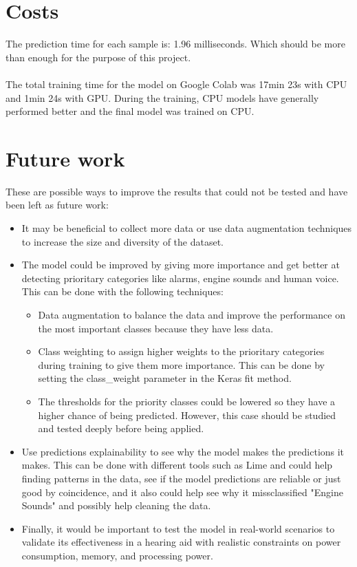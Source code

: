 \documentclass[12pt,oneside,a4paper,english]{article}
\begin{document}
\section{Costs}
The prediction time for each sample is: 1.96 milliseconds. Which should be more than enough for the purpose of this project.
\\
\\
The total training time for the model on Google Colab was 17min 23s with CPU and 1min 24s with GPU. During the training, CPU models have generally performed better and the final model was trained on CPU. 


\section{Future work}
These are possible ways to improve the results that could not be tested and have been left as future work:

\begin{itemize}
  \item It may be beneficial to collect more data or use data augmentation techniques to increase the size and diversity of the dataset. \cite{towardsdatascience_audio_dl_3}
  \item The model could be improved by giving more importance and get better at detecting prioritary categories like alarms, engine sounds and human voice. This can be done with the following techniques:
  \begin{itemize}
      \item Data augmentation to balance the data and improve the performance on the most important classes because they have less data.
      \item  Class weighting to assign higher weights to the prioritary categories during training to give them more importance. This can be done by setting the class\_weight parameter in the Keras fit method. 
      \item  The thresholds for the priority classes could be lowered so they have a higher chance of being predicted. However, this case should be studied and tested deeply before being applied.
    \end{itemize}
  \item Use predictions explainability to see why the model makes the predictions it makes. This can be done with different tools such as Lime\cite{lime} and could help finding patterns in the data, see if the model predictions are reliable or just good by coincidence, and it also could help see why it missclassified "Engine Sounds" and possibly help cleaning the data.
  \item Finally, it would be important to test the model in real-world scenarios to validate its effectiveness in a hearing aid with realistic constraints on power consumption, memory, and processing power.

\end{itemize}
\end{document}
